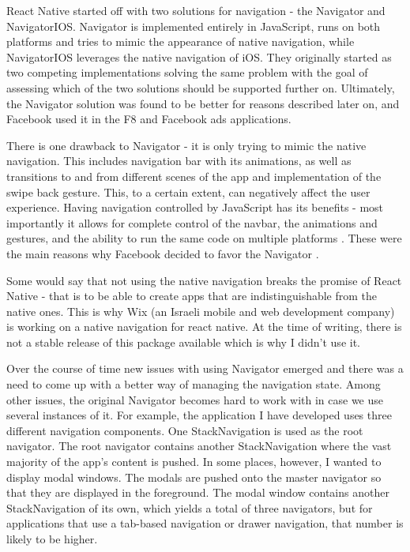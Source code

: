 React Native started off with two solutions for navigation - the Navigator and NavigatorIOS. Navigator is implemented entirely in JavaScript, runs on both platforms and tries to mimic the appearance of native navigation, while NavigatorIOS leverages the native navigation of iOS.
They originally started as two competing implementations solving the same problem \cite{rn:navigation}  with the goal of assessing which of the two solutions should be supported further on. Ultimately, the Navigator solution was found to be better for reasons described later on, and Facebook used it in the F8 and Facebook ads applications.


There is one drawback to Navigator - it is only trying to mimic the native navigation. This includes navigation bar with its animations, as well as transitions to and from different scenes of the app and implementation of the swipe back gesture. This, to a certain extent, can negatively affect the user experience.
Having navigation controlled by JavaScript has its benefits - most importantly it allows for complete control of the navbar, the animations and gestures, and the ability to run the same code on multiple platforms \cite{rn:navigation}. These were the main reasons why Facebook decided to favor the Navigator \cite{rn:navigation}.

Some would say that not using the native navigation breaks the promise of React Native - that is to be able to create apps that are indistinguishable from the native ones. This is why Wix (an Israeli mobile and web development company) is working on a native navigation for react native. At the time of writing, there is not a stable release of this package available which is why I didn't use it.

Over the course of time new issues with using Navigator emerged and there was a need to come up with a better way of managing the navigation state. Among other issues, the original Navigator becomes hard to work with in case we use several instances of it. For example, the application I have developed uses three different navigation components. One StackNavigation is used as the root navigator. The root navigator contains another StackNavigation where the vast majority of the app's content is pushed. In some places, however, I wanted to display modal windows. The modals are pushed onto the master navigator so that they are displayed in the foreground. The modal window contains another StackNavigation of its own, which yields a total of three navigators, but for applications that use a tab-based navigation or drawer navigation, that number is likely to be higher. 


